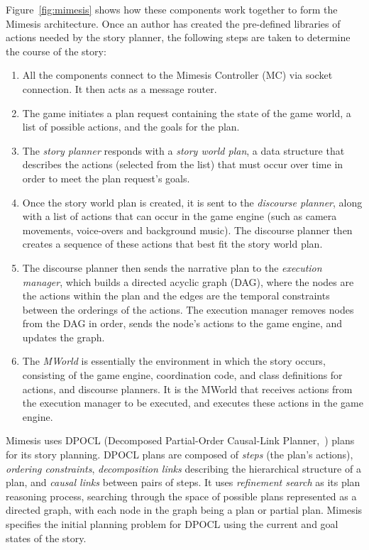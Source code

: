 \documentclass[11pt]{report}
\begin{document}
Figure~\ref{fig:mimesis} shows how these components work together to form the
Mimesis architecture. Once an author has created the pre-defined libraries of
actions needed by the story planner, the following steps are taken to determine
the course of the story:

\begin{enumerate}
  \item All the components connect to the Mimesis Controller (MC) via socket
    connection. It then acts as a message router.
  \item The game initiates a plan request containing the state of the game
    world, a list of possible actions, and the goals for the plan.
  \item The \emph{story planner} responds with a \emph{story world plan}, a data
    structure that describes the actions (selected from the list) that must occur over time in order to
    meet the plan request's goals.
  \item Once the story world plan is created, it is sent to the \emph{discourse
      planner}, along with a list of actions that can occur in the game engine
    (such as camera movements, voice-overs and background
    music). The discourse planner then creates a sequence of these actions that
    best fit the story world plan.
  \item The discourse planner then sends the narrative plan to the
    \emph{execution manager}, which builds a directed acyclic graph (DAG), where
    the nodes are the actions within the plan and the edges are the temporal
    constraints between the orderings of the actions. The execution manager
    removes nodes from the DAG in order, sends the node's actions to the
    game engine, and updates the graph.
  \item The \emph{MWorld} is essentially the environment in which the story
    occurs, consisting of the game engine, coordination code, and class
    definitions for actions, and discourse planners. It is the MWorld that
    receives actions from the execution manager to be executed, and executes
    these actions in the game engine.
\end{enumerate}

Mimesis uses DPOCL (Decomposed Partial-Order Causal-Link Planner,~\citep{young1994decomposition}) plans for
its story planning. DPOCL plans are composed of \emph{steps} (the plan's
actions), \emph{ordering constraints}, \emph{decomposition links} describing the
hierarchical structure of a plan, and \emph{causal links} between pairs of
steps. It uses \emph{refinement search} \citep{kambhampati1995planning} as its
plan reasoning process, searching through the space of possible plans represented as a directed
graph, with each node in the graph being a plan or partial plan. Mimesis
specifies the initial planning problem for DPOCL using the current and goal
states of the story.
\end{document}
